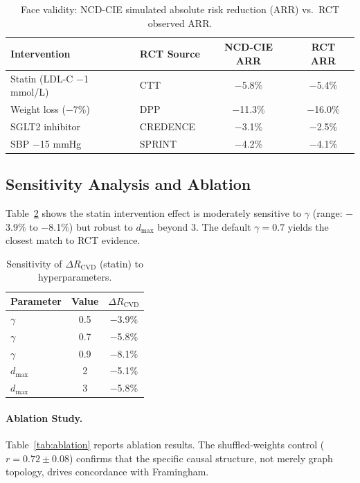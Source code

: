 \documentclass[runningheads]{llncs}
\begin{document}
\begin{table}[t]
\centering
\caption{Face validity: NCD-CIE simulated absolute risk reduction
(ARR) vs.\ RCT observed ARR.}
\label{tab:rct}
\small
\begin{tabular}{@{}llcc@{}}
\toprule
\textbf{Intervention} & \textbf{RCT Source} &
\textbf{NCD-CIE ARR} & \textbf{RCT ARR} \\
\midrule
Statin (LDL-C $-$1 mmol/L) & CTT~\cite{ctt2010}
  & $-$5.8\% & $-$5.4\% \\
Weight loss ($-$7\%) & DPP~\cite{knowler2002dpp}
  & $-$11.3\% & $-$16.0\% \\
SGLT2 inhibitor & CREDENCE~\cite{perkovic2019credence}
  & $-$3.1\% & $-$2.5\% \\
SBP $-$15 mmHg & SPRINT~\cite{sprint2015}
  & $-$4.2\% & $-$4.1\% \\
\bottomrule
\end{tabular}
\end{table}

\subsection{Sensitivity Analysis and Ablation}\label{sec:sensitivity}

Table~\ref{tab:sensitivity} shows the statin intervention effect is
moderately sensitive to $\gamma$ (range: $-$3.9\% to $-$8.1\%) but
robust to $d_{\max}$ beyond 3.  The default $\gamma = 0.7$ yields
the closest match to RCT evidence.

\begin{table}[t]
\centering
\caption{Sensitivity of $\Delta R_{\text{CVD}}$ (statin) to
hyperparameters.}\label{tab:sensitivity}
\small
\begin{tabular}{@{}lcc@{}}
\toprule
\textbf{Parameter} & \textbf{Value} & \textbf{$\Delta R_{\text{CVD}}$} \\
\midrule
$\gamma$ & 0.5 & $-$3.9\% \\
$\gamma$ & 0.7 & $-$5.8\% \\
$\gamma$ & 0.9 & $-$8.1\% \\
$d_{\max}$ & 2 & $-$5.1\% \\
$d_{\max}$ & 3 & $-$5.8\% \\
\bottomrule
\end{tabular}
\end{table}

\paragraph{Ablation Study.}\label{sec:ablation}
Table~\ref{tab:ablation} reports ablation results.  The
shuffled-weights control ($r = 0.72 \pm 0.08$) confirms that the
specific causal structure, not merely graph topology, drives
concordance with Framingham.
\end{document}
